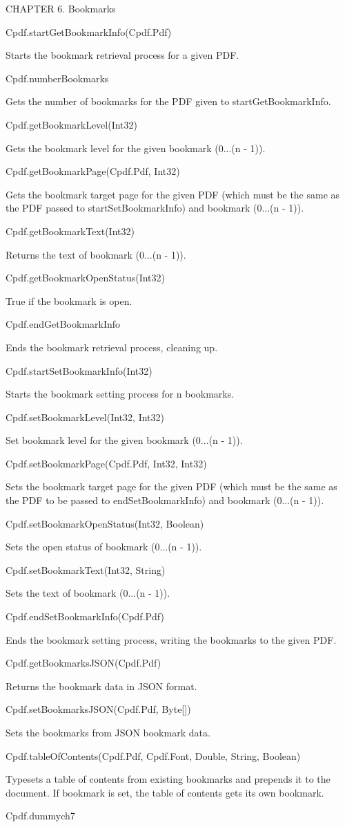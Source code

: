 CHAPTER 6. Bookmarks

Cpdf.startGetBookmarkInfo(Cpdf.Pdf)


Starts the bookmark retrieval process for a
given PDF.


Cpdf.numberBookmarks


Gets the number of bookmarks for the PDF given to
startGetBookmarkInfo.


Cpdf.getBookmarkLevel(Int32)


Gets the bookmark level for the given bookmark
(0...(n - 1)).


Cpdf.getBookmarkPage(Cpdf.Pdf, Int32)


Gets the bookmark target page for the given PDF
(which must be the same as the PDF passed to startSetBookmarkInfo)
and bookmark (0...(n - 1)).


Cpdf.getBookmarkText(Int32)


Returns the text of bookmark (0...(n - 1)).


Cpdf.getBookmarkOpenStatus(Int32)


True if the bookmark is open.


Cpdf.endGetBookmarkInfo


Ends the bookmark retrieval process, cleaning up.


Cpdf.startSetBookmarkInfo(Int32)


Starts the bookmark setting process for n
bookmarks.


Cpdf.setBookmarkLevel(Int32, Int32)


Set bookmark level for the given bookmark
(0...(n - 1)).


Cpdf.setBookmarkPage(Cpdf.Pdf, Int32, Int32)


Sets the bookmark target
page for the given PDF (which must be the same as the PDF to be passed to
endSetBookmarkInfo) and bookmark (0...(n - 1)).


Cpdf.setBookmarkOpenStatus(Int32, Boolean)


Sets the open status of bookmark (0...(n - 1)).


Cpdf.setBookmarkText(Int32, String)


Sets the text of bookmark (0...(n - 1)).


Cpdf.endSetBookmarkInfo(Cpdf.Pdf)


Ends the bookmark setting process, writing the
bookmarks to the given PDF.


Cpdf.getBookmarksJSON(Cpdf.Pdf)


Returns the bookmark data in JSON format.


Cpdf.setBookmarksJSON(Cpdf.Pdf, Byte[])


Sets the bookmarks from JSON bookmark data.


Cpdf.tableOfContents(Cpdf.Pdf, Cpdf.Font, Double, String, Boolean)


Typesets a table
of contents from existing bookmarks and prepends it to the document. If
bookmark is set, the table of contents gets its own bookmark.


Cpdf.dummych7

